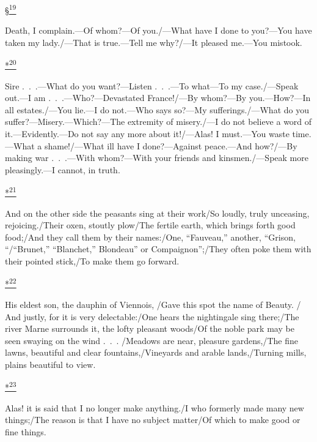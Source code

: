 \protect\hypertarget{23_NOTES.xhtmlux5cux23id_2732}{\protect\hyperlink{21_Chapter_Thirteen__IMAGE_AND_WORD.xhtmlux5cux23id_2731}{§\textsuperscript{19}}}
Death, I complain.---Of whom?---Of you./---What have I done to
you?---You have taken my lady./---That is true.---Tell me why?/---It
pleased me.---You mistook.

\protect\hypertarget{23_NOTES.xhtmlux5cux23id_2734}{\protect\hyperlink{21_Chapter_Thirteen__IMAGE_AND_WORD.xhtmlux5cux23id_2733}{*\textsuperscript{20}}}
Sire .~.~.---What do you want?---Listen .~.~.---To what---To my
case./---Speak out.---I am .~.~.---Who?---Devastated France!/---By
whom?---By you.---How?---In all estates./---You lie.---I do not.---Who
says so?---My sufferings./---What do you
suffer?---Misery.---Which?---The extremity of misery./---I do not
believe a word of it.---Evidently.---Do not say any more about
it!/---Alas! I must.---You waste time.---What a shame!/---What ill have
I done?---Against peace.---And how?/---By making war .~.~.---With
whom?---With your friends and kinsmen./---Speak more pleasingly.---I
cannot, in truth.

\protect\hypertarget{23_NOTES.xhtmlux5cux23id_2736}{\protect\hyperlink{21_Chapter_Thirteen__IMAGE_AND_WORD.xhtmlux5cux23id_2735}{*\textsuperscript{21}}}
And on the other side the peasants sing at their work/So loudly, truly
unceasing, rejoicing./Their oxen, stoutly plow/The fertile earth, which
brings forth good food;/And they call them by their names:/One,
``Fauveau,'' another, ``Grison, ``/``Brunet,'' ``Blanchet,'' Blondeau''
or Compaignon'';/They often poke them with their pointed stick,/To make
them go forward.

\protect\hypertarget{23_NOTES.xhtmlux5cux23id_2738}{\protect\hyperlink{21_Chapter_Thirteen__IMAGE_AND_WORD.xhtmlux5cux23id_2737}{*\textsuperscript{22}}}
His eldest son, the dauphin of Viennois, /Gave this spot the name of
Beauty. / And justly, for it is very delectable:/One hears the
nightingale sing there;/The river Marne surrounds it, the lofty pleasant
woods/Of the noble park may be seen swaying on the wind .~.~. /Meadows
are near, pleasure gardens,/The fine lawns, beautiful and clear
fountains,/Vineyards and arable lands,/Turning mills, plains beautiful
to view.

\protect\hypertarget{23_NOTES.xhtmlux5cux23id_2740}{\protect\hyperlink{21_Chapter_Thirteen__IMAGE_AND_WORD.xhtmlux5cux23id_2739}{*\textsuperscript{23}}}
Alas! it is said that I no longer make anything./I who formerly made
many new things;/The reason is that I have no subject matter/Of which to
make good or fine things.


